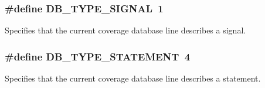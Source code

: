 \subsubsection{\setlength{\rightskip}{0pt plus 5cm}\#define DB\_\-TYPE\_\-SIGNAL\ 1}\label{group__db__types_a0}


Specifies that the current coverage database line describes a signal. 
\subsubsection{\setlength{\rightskip}{0pt plus 5cm}\#define DB\_\-TYPE\_\-STATEMENT\ 4}\label{group__db__types_a3}


Specifies that the current coverage database line describes a statement. 